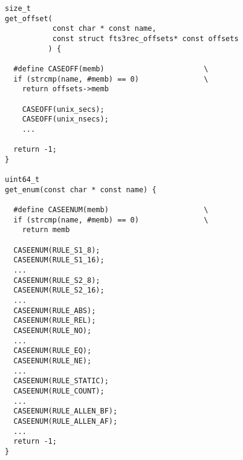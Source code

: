 \begin{lstlisting}
size_t
get_offset(
           const char * const name,
           const struct fts3rec_offsets* const offsets
          ) {

  #define CASEOFF(memb)                       \
  if (strcmp(name, #memb) == 0)               \
    return offsets->memb

    CASEOFF(unix_secs);
    CASEOFF(unix_nsecs);
    ...

  return -1;
}

uint64_t
get_enum(const char * const name) {

  #define CASEENUM(memb)                      \
  if (strcmp(name, #memb) == 0)               \
    return memb

  CASEENUM(RULE_S1_8);
  CASEENUM(RULE_S1_16);
  ...
  CASEENUM(RULE_S2_8);
  CASEENUM(RULE_S2_16);
  ...
  CASEENUM(RULE_ABS);
  CASEENUM(RULE_REL);
  CASEENUM(RULE_NO);
  ...
  CASEENUM(RULE_EQ);
  CASEENUM(RULE_NE);
  ...
  CASEENUM(RULE_STATIC);
  CASEENUM(RULE_COUNT);
  ...
  CASEENUM(RULE_ALLEN_BF);
  CASEENUM(RULE_ALLEN_AF);
  ...
  return -1;
}
\end{lstlisting}

